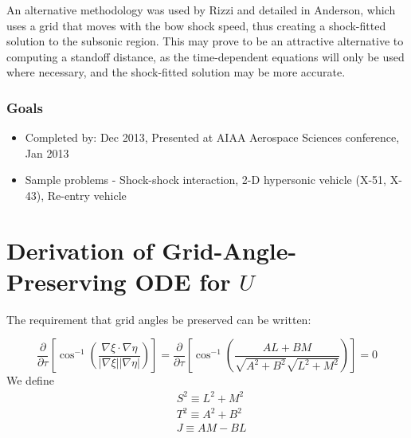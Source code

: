 \documentclass[12pt,letterpaper]{article}
\begin{document}
An alternative methodology was used by Rizzi\cite{rizzi76} and
detailed in Anderson\cite{anderson2004modern}, which uses a grid that
moves with the bow shock speed, thus creating a shock-fitted solution
to the subsonic region. This may prove to be an attractive alternative
to computing a standoff distance, as the time-dependent equations will
only be used where necessary, and the shock-fitted solution may be
more accurate.

\subsubsection{Goals}
\begin{itemize}
\item Completed by: Dec 2013, Presented at AIAA Aerospace Sciences conference, Jan 2013
\item Sample problems - Shock-shock interaction, 2-D hypersonic vehicle
  (X-51, X-43), Re-entry vehicle
\end{itemize}



\appendix
\section{Derivation of Grid-Angle-Preserving ODE for $U$}
\label{sec:grid_angle_appendix}
The requirement that grid angles be preserved can be written:

\begin{equation}
\label{eq:grid_preserving_appendix}
\frac{\partial}{\partial \tau}\left[\cos^{-1}\left(
\frac{\nabla \xi \cdot \nabla \eta}{\left|\nabla \xi\right|\left|\nabla \eta\right|}
\right)\right]
=
\frac{\partial}{\partial \tau}\left[\cos^{-1}\left(
\frac{AL+BM}{\sqrt{A^2+B^2}\sqrt{L^2+M^2}}
\right)\right]
= 0
\end{equation}
We define
\begin{align}
&S^2\equiv L^2+M^2\\
&T^2\equiv A^2+B^2\\
&J\equiv AM-BL
\end{align}
\end{document}
